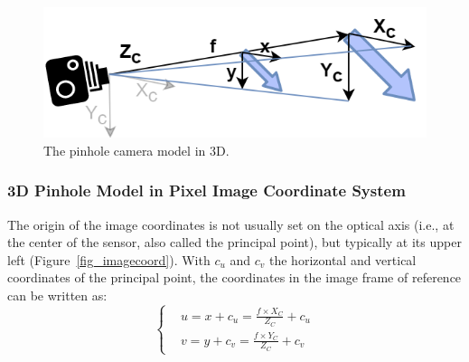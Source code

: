 

\begin{figure}[hbtp]
	\centering
	\def\svgwidth{\columnwidth}
	\fontsize{10pt}{10pt}\selectfont
	\includegraphics[width=0.5\linewidth]{"../Chap2/Figures/Camera_3D.png"}
	\caption{The pinhole camera model in 3D.} 
	\label{fig_camera3d}
\end{figure}


\subsubsection{3D Pinhole Model in Pixel Image Coordinate System}

The origin of the image coordinates is not usually set on the optical axis (i.e., at the center of the sensor, also called the principal point), but typically at its upper left (Figure~\ref{fig_imagecoord}). With $c_u$ and $c_v$ the horizontal and vertical coordinates of the principal point, the coordinates in the image frame of reference can be written as: 
\begin{equation}
  \begin{cases}
    &u = x + c_u = \frac{f\times X_C}{Z_C} + c_u\\
    &v = y + c_v = \frac{f\times Y_C}{Z_C} + c_v
  \end{cases}
\end{equation}

